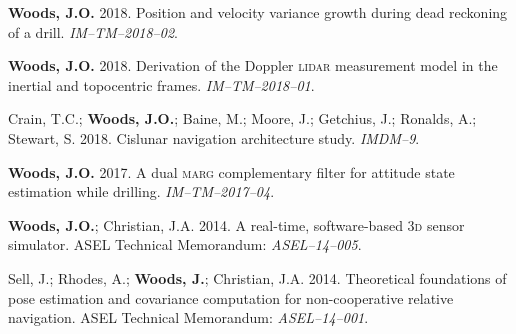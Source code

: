 \documentclass[12pt,letterpaper]{article}
\begin{document}
\medskip
\par \textbf{Woods, J.O.} 2018. Position and velocity variance growth during dead reckoning of a drill. \textit{IM--TM--2018--02}.

\medskip
\par \textbf{Woods, J.O.} 2018. Derivation of the Doppler \textsc{lidar} measurement model in the inertial and topocentric frames. \textit{IM--TM--2018--01}.

\medskip
\par Crain, T.C.; \textbf{Woods, J.O.}; Baine, M.; Moore, J.; Getchius, J.; Ronalds, A.; Stewart, S. 2018. Cislunar navigation architecture study. \textit{IMDM--9}.

\medskip
\par \textbf{Woods, J.O.} 2017. A dual \textsc{marg} complementary filter for attitude state estimation while drilling. \textit{IM--TM--2017--04}.

\medskip
\par \textbf{Woods, J.O.}; Christian, J.A. 2014. A real-time, software-based \textsc{3d} sensor simulator. ASEL Technical Memorandum: \textit{ASEL--14--005}.

\medskip
\par Sell, J.; Rhodes, A.; \textbf{Woods, J.}; Christian, J.A. 2014. Theoretical foundations of pose estimation and covariance computation for non-cooperative relative navigation. ASEL Technical Memorandum: \textit{ASEL--14--001}.
%
\end{document}
